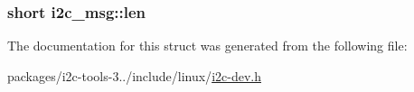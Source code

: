 \subsubsection[{len}]{\setlength{\rightskip}{0pt plus 5cm}short i2c\+\_\+msg\+::len}\label{structi2c__msg_a10d1943df9a527109bf60733baf7b0a4}


The documentation for this struct was generated from the following file\+:\begin{DoxyCompactItemize}
\item 
packages/i2c-\/tools-\/3../include/linux/\hyperlink{i2c-tools-3_81_81_2include_2linux_2i2c-dev_8h}{i2c-\/dev.\+h}\end{DoxyCompactItemize}
